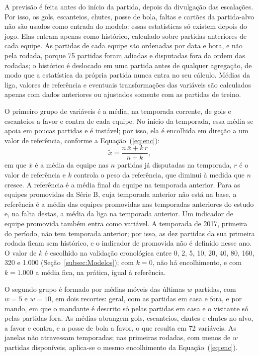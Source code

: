 A previsão é feita antes do início da partida, depois da divulgação das escalações. Por isso, os gols, escanteios, chutes, posse de bola, faltas e cartões da partida-alvo não são usados como entrada do modelo: essas estatísticas só existem depois do jogo. Elas entram apenas como histórico, calculado sobre partidas anteriores de cada equipe. As partidas de cada equipe são ordenadas por data e hora, e não pela rodada, porque 75 partidas foram adiadas e disputadas fora da ordem das rodadas; o histórico é deslocado em uma partida antes de qualquer agregação, de modo que a estatística da própria partida nunca entra no seu cálculo. Médias da liga, valores de referência e eventuais transformações das variáveis são calculados apenas com dados anteriores ou ajustados somente com as partidas de treino.

O primeiro grupo de variáveis é a média, na temporada corrente, de gols e escanteios a favor e contra de cada equipe. No início da temporada, essa média se apoia em poucas partidas e é instável; por isso, ela é encolhida em direção a um valor de referência, conforme a Equação~(\ref{eq:enc}):
\begin{equation}\label{eq:enc}
  \tilde{x} = \frac{n\,\bar{x} + k\,r}{n + k},
\end{equation}
em que $\bar{x}$ é a média da equipe nas $n$ partidas já disputadas na temporada, $r$ é o valor de referência e $k$ controla o peso da referência, que diminui à medida que $n$ cresce. A referência é a média final da equipe na temporada anterior. Para as equipes promovidas da Série B, cuja temporada anterior não está na base, a referência é a média das equipes promovidas nas temporadas anteriores do estudo e, na falta destas, a média da liga na temporada anterior. Um indicador de equipe promovida também entra como variável. A temporada de 2017, primeira do período, não tem temporada anterior; por isso, as dez partidas da sua primeira rodada ficam sem histórico, e o indicador de promovida não é definido nesse ano. O valor de $k$ é escolhido na validação cronológica entre 0, 2, 5, 10, 20, 40, 80, 160, 320 e 1.000 (Seção~\ref{subsec:Modelos}); com $k = 0$, não há encolhimento, e com $k = 1.000$ a média fica, na prática, igual à referência.

O segundo grupo é formado por médias móveis das últimas $w$ partidas, com $w = 5$ e $w = 10$, em dois recortes: geral, com as partidas em casa e fora, e por mando, em que o mandante é descrito só pelas partidas em casa e o visitante só pelas partidas fora. As médias abrangem gols, escanteios, chutes e chutes no alvo, a favor e contra, e a posse de bola a favor, o que resulta em 72 variáveis. As janelas não atravessam temporadas; nas primeiras rodadas, com menos de $w$ partidas disponíveis, aplica-se o mesmo encolhimento da Equação~(\ref{eq:enc}).

